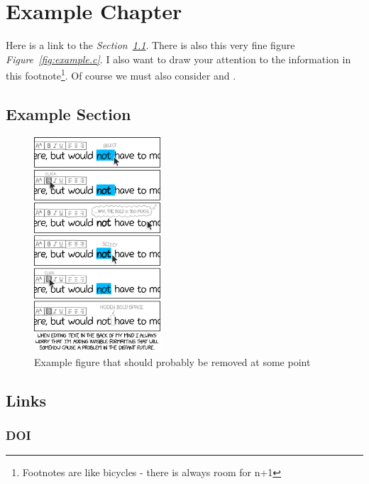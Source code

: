 \chapter{Example Chapter}
\label{chap:example}

Here is a link to the {\textit{Section~\ref{sec:example.examplesec}}}. There is also this very fine figure {\textit{Figure~\ref{fig:example.c}}}. I also want to draw your attention to the information in this footnote\footnote{Footnotes are like bicycles - there is always room for n+1}. Of course we must also consider \citet{leach2018iain} and \citet{martin2021shadow}.

\lipsum[1]

\section{Example Section}
\label{sec:example.examplesec}

\lipsum[2]

\begin{figure}[h!]
	\centering
	\captionsetup{justification=centering}
	\includegraphics[height=8cm]{images/examples/xkcd_2109_invisible_formatting_2x.png}
	\caption[Example figure A]{Example figure that should probably be removed at some point\protect\footnotemark}
	\label{fig:example.a}
\end{figure}

\clearpage

\section{Links}
\label{sec:example.links}

\subsection{DOI}
\label{sec:example..links.doi}


